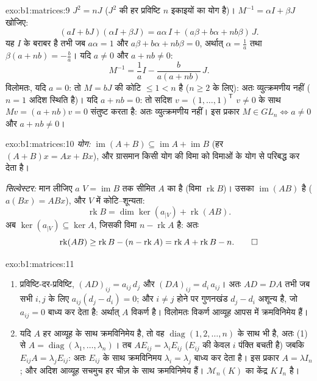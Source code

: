 \begin{solution}{exo:b1:matrices:9}
$J^2 = nJ$ ($J^2$ की हर प्रविष्टि $n$ इकाइयों का योग है)। $M^{-1} = \alpha I
+ \beta J$ खोजिए:
\[
(aI + bJ)(\alpha I + \beta J)
= a\alpha\, I + (a\beta + b\alpha + nb\beta)\, J .
\]
यह $I$ के बराबर है तभी जब $a\alpha = 1$ और $a\beta + b\alpha + nb\beta = 0$,
अर्थात् $\alpha = \frac1a$ तथा $\beta(a + nb) = -\frac ba$। यदि $a \neq 0$
और $a + nb \neq 0$:
\[
M^{-1} = \frac 1a I - \frac{b}{a(a + nb)}\, J .
\]
विलोमतः, यदि $a = 0$: तो $M = bJ$ की कोटि $\leq 1 < n$ है ($n \geq 2$ के
लिए): अतः व्युत्क्रमणीय नहीं ($n = 1$ अदिश स्थिति है)। यदि $a + nb = 0$: तो
सदिश $v = (1, \dots, 1)^{\mathsf T}$ $v \neq 0$ के साथ $Mv = (a + nb)v = 0$
संतुष्ट करता है: अतः व्युत्क्रमणीय नहीं। इस प्रकार $M \in GL_n \iff a \neq
0$ और $a + nb \neq 0$।
\end{solution}

\begin{solution}{exo:b1:matrices:10}
\emph{योग:} $\operatorname{im}(A + B) \subseteq \operatorname{im} A +
\operatorname{im} B$ (हर $(A+B)x = Ax + Bx$), और ग्रासमान किसी योग की विमा
को विमाओं के योग से परिबद्ध कर देता है।

\emph{सिल्वेस्टर:} मान लीजिए $a$ $V = \operatorname{im} B$ तक सीमित $A$ का
 है (विमा $\operatorname{rk} B$)। उसका 
$\operatorname{im}(AB)$ है ($a(Bx) = ABx$), और $V$ में कोटि--शून्यता:
\[
\operatorname{rk} B = \dim\ker(a_{|V}) + \operatorname{rk}(AB) .
\]
अब $\ker(a_{|V}) \subseteq \ker A$, जिसकी विमा $n - \operatorname{rk} A$ है:
अतः
\[
\operatorname{rk}(AB) \geq \operatorname{rk} B - (n -
\operatorname{rk} A) = \operatorname{rk} A + \operatorname{rk} B -
n . \qedhere
\]
\end{solution}

\begin{solution}{exo:b1:matrices:11}
\begin{enumerate}
  \item प्रविष्टि-दर-प्रविष्टि, $(AD)_{ij} = a_{ij}\,d_j$ और $(DA)_{ij} =
  d_i\,a_{ij}$। अतः $AD = DA$ तभी जब सभी $i, j$ के लिए $a_{ij}(d_j - d_i) =
  0$; और $i \neq j$ होने पर गुणनखंड $d_j - d_i$ अशून्य है, जो $a_{ij} = 0$
  बाध्य कर देता है: अर्थात् $A$ विकर्ण है। विलोमतः विकर्ण आव्यूह आपस में
  क्रमविनिमेय हैं।
  \item यदि $A$ हर आव्यूह के साथ क्रमविनिमेय है, तो वह
  $\operatorname{diag}(1, 2, \dots, n)$ के साथ भी है, अतः (1) से $A =
  \operatorname{diag}(\lambda_1, \dots, \lambda_n)$। तब $A E_{ij} =
  \lambda_i E_{ij}$ ($E_{ij}$ की केवल $i$ पंक्ति बचती है) जबकि $E_{ij} A =
  \lambda_j E_{ij}$: अतः $E_{ij}$ के साथ क्रमविनिमय $\lambda_i = \lambda_j$
  बाध्य कर देता है। इस प्रकार $A = \lambda I_n$; और अदिश आव्यूह सचमुच हर
  चीज़ के साथ क्रमविनिमेय हैं। $\mathcal{M}_n(K)$ का केंद्र $K\,I_n$ है।
\end{enumerate}
\end{solution}

